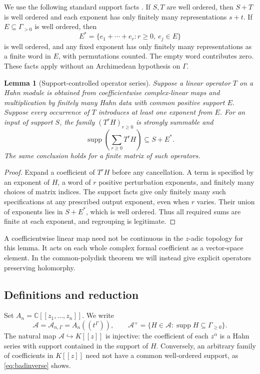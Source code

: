 \documentclass[11pt,letterpaper]{article}
\newtheorem{lemma}[lemma]{Lemma}
\theoremstyle{definition}
\theoremstyle{remark}
\newcommand{\C}{\mathbb C}
\newcommand{\A}{\mathscr A}
\newcommand{\supp}{\operatorname{supp}}
\numberwithin{equation}{section}
\begin{document}
We use the following standard support facts \cite{Neumann,Poonen}. If $S,T$ are well ordered, then $S+T$ is well ordered and each exponent has only finitely many representations $s+t$. If $E\subseteq\Gamma_{>0}$ is well ordered, then
\[
 E^*=\{e_1+\cdots+e_r:r\geq0,\ e_j\in E\}
\]
is well ordered, and any fixed exponent has only finitely many representations as a finite word in $E$, with permutations counted. The empty word contributes zero. These facts apply without an Archimedean hypothesis on $\Gamma$.

\begin{lemma}[Support-controlled operator series]\label{lem:operators}
Suppose a linear operator $T$ on a Hahn module is obtained from coefficientwise complex-linear maps and multiplication by finitely many Hahn data with common positive support $E$. Suppose every occurrence of $T$ introduces at least one exponent from $E$. For an input of support $S$, the family $(T^rH)_{r\geq0}$ is strongly summable and
\[
 \supp\left(\sum_{r\geq0}T^rH\right)\subseteq S+E^*.
\]
The same conclusion holds for a finite matrix of such operators.
\end{lemma}
\begin{proof}
Expand a coefficient of $T^rH$ before any cancellation. A term is specified by an exponent of $H$, a word of $r$ positive perturbation exponents, and finitely many choices of matrix indices. The support facts give only finitely many such specifications at any prescribed output exponent, even when $r$ varies. Their union of exponents lies in $S+E^*$, which is well ordered. Thus all required sums are finite at each exponent, and regrouping is legitimate.
\end{proof}
A coefficientwise linear map need not be continuous in the $z$-adic topology for this lemma. It acts on each whole complex formal coefficient as a vector-space element. In the common-polydisk theorem we will instead give explicit operators preserving holomorphy.

\subsection{Definitions and reduction}
Set $A_n=\C[[z_1,\ldots,z_n]]$. We write
\begin{equation}\label{eq:Adef}
 \A=\A_{n,\Gamma}=A_n((t^\Gamma)),\qquad
 \A^+=\{H\in\A:\supp H\subseteq\Gamma_{\geq0}\}.
\end{equation}
The natural map $\A\hookrightarrow K[[z]]$ is injective: the coefficient of each $z^\alpha$ is a Hahn series with support contained in the support of $H$. Conversely, an arbitrary family of coefficients in $K[[z]]$ need not have a common well-ordered support, as \eqref{eq:badinverse} shows.
\end{document}
